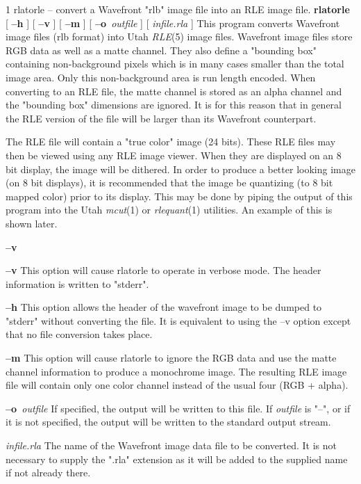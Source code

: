 %
%
%
 1
rlatorle -- convert a Wavefront "rlb" image file into an RLE image file.
{\bf rlatorle}
[
{\bf --h}
] [
{\bf --v}
] [
{\bf --m}
] [
{\bf --o}{\it \ outfile}
] [
{\it infile.rla}
]
This program converts Wavefront image files (rlb format) into Utah
{\it RLE}{\rm (5)}
image files.  Wavefront image files store RGB data as well as a matte channel.
They also define a "bounding box" containing non-background pixels which is in
many cases smaller than the total image area.  Only this non-background area is
run length encoded.  When converting to an RLE file, the matte channel is
stored as an alpha channel and the "bounding box" dimensions are ignored.  It
is for this reason that in general the RLE version of the file will be larger
than its Wavefront counterpart.
\par
The RLE file will contain a "true color" image
(24 bits).  These RLE files may then be viewed using any RLE image viewer.  When
they are displayed on an 8 bit display, the image will be dithered.  In order
to produce a better looking image (on 8 bit displays), it is recommended that
the image be quantizing (to 8 bit mapped color) prior to its display.  This may
be done by piping the output of this program into the Utah
{\it mcut}{\rm (1)}
or
{\it rlequant}{\rm (1)}
utilities.
An example of this is shown later.
\par
{}
\begin{TPlist}{{\bf --v}}
\item[{{\bf --v}}]
This option will cause rlatorle to operate in verbose mode.  The header
information is written to "stderr".
\item[{{\bf --h}}]
This option allows the header of the wavefront image to be dumped to "stderr"
without converting the file.  It is equivalent to using the --v option except
that no file conversion takes place.
\item[{{\bf --m}}]
This option will cause rlatorle to ignore the RGB data and use the matte
channel information to produce a monochrome image.  The resulting RLE image
file will contain only one color channel instead of the usual four
(RGB + alpha).
\item[{{\bf --o}{\it \ outfile}
}]
If specified, the output will be written to this file.  If 
{\it outfile}
is "--", or if it is not specified, the output will be written to the
standard output stream.
\item[{{\it infile.rla}}]
The name of the Wavefront image data file to be converted.  It is not necessary
to supply the ".rla" extension as it will be added to the supplied name if not
already there.
\end{TPlist}
